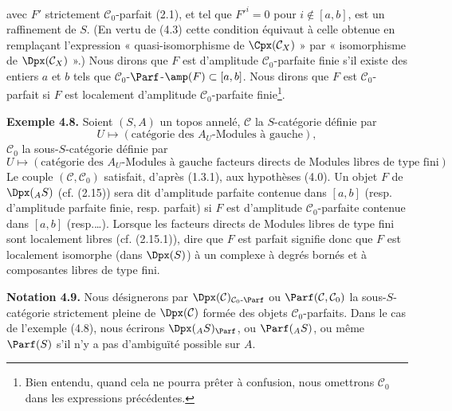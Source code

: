 avec \(F'\) strictement \(\mathcal C_0\)-parfait (2.1), et tel que \(F'^i=0\) pour \(i\notin[a,b]\), est un raffinement de \(S\). (En vertu de (4.3) cette condition équivaut à celle obtenue en remplaçant l'expression « quasi-isomorphisme de \(\Cpx(\mathcal C_X)\) » par « isomorphisme de \(\Dpx(\mathcal C_X)\) ».) Nous dirons que \(F\) est d'amplitude \(\mathcal C_0\)-parfaite finie s'il existe des entiers \(a\) et \(b\) tels que \(\mathcal C_0\)-\(\Parf\)-\(\amp(F)\subset[a,b]\). Nous dirons que \(F\) est \(\mathcal C_0\)-parfait si \(F\) est localement d'amplitude \(\mathcal C_0\)-parfaite finie\footnote{Bien entendu, quand cela ne pourra prêter à confusion, nous omettrons \(\mathcal C_0\) dans les expressions précédentes.}.

\textbf{Exemple 4.8.} Soient \((S,A)\) un topos annelé, \(\mathcal C\) la \(S\)-catégorie définie par
\[
  U\longmapsto (\text{catégorie des }A_U\text{-Modules à gauche}),
\]
\(\mathcal C_0\) la sous-\(S\)-catégorie définie par
\[
  U\longmapsto (\text{catégorie des }A_U\text{-Modules à gauche facteurs directs de Modules libres de type fini}).
\]
Le couple \((\mathcal C,\mathcal C_0)\) satisfait, d'après (1.3.1), aux hypothèses (4.0). Un objet \(F\) de \(\Dpx(_A S)\) (cf. (2.15)) sera dit d'amplitude parfaite contenue dans \([a,b]\) (resp. d'amplitude parfaite finie, resp. parfait) si \(F\) est d'amplitude \(\mathcal C_0\)-parfaite contenue dans \([a,b]\) (resp.\dots). Lorsque les facteurs directs de Modules libres de type fini sont localement libres (cf. (2.15.1)), dire que \(F\) est parfait signifie donc que \(F\) est localement isomorphe (dans \(\Dpx(S)\)) à un complexe à degrés bornés et à composantes libres de type fini.

\textbf{Notation 4.9.} Nous désignerons par \(\Dpx(\mathcal C)_{\mathcal C_0\text{-}\Parf}\) ou \(\Parf(\mathcal C,\mathcal C_0)\) la sous-\(S\)-catégorie strictement pleine de \(\Dpx(\mathcal C)\) formée des objets \(\mathcal C_0\)-parfaits. Dans le cas de l'exemple (4.8), nous écrirons \(\Dpx(_A S)_{\Parf}\), ou \(\Parf(_A S)\), ou même \(\Parf(S)\) s'il n'y a pas d'ambiguïté possible sur \(A\).

